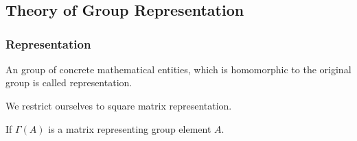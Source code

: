 \chapter{}\label{chap6}

\section*{Theory of Group Representation}

\subsection*{Representation}
An group of concrete mathematical entities, which is homomorphic to the original group is called representation.

We restrict ourselves to square matrix representation.

If $\Gamma(A)$ is a matrix representing group element $A$.


